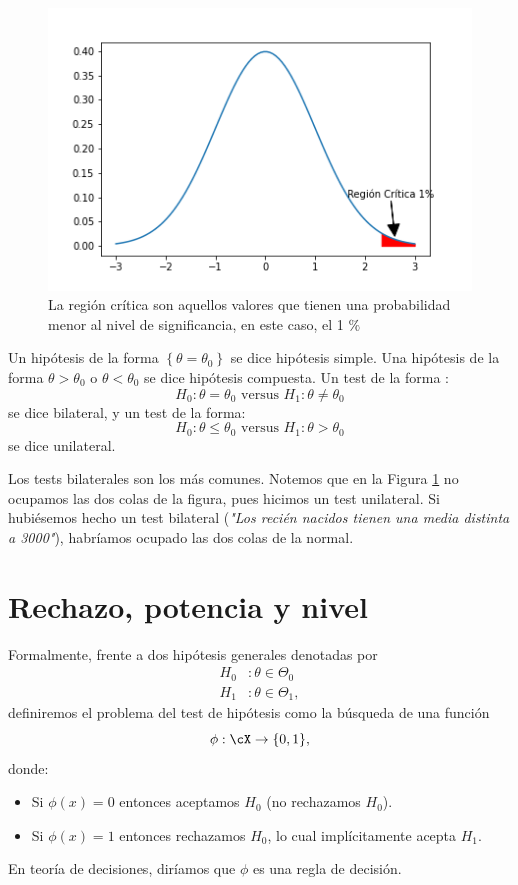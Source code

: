 \begin{figure}[ht]
    \centering
    \includegraphics[scale=0.7]{img/Region_critica.png}
    \caption{La región crítica son aquellos valores que tienen una probabilidad menor al nivel de significancia, en este caso, el 1 $\%$}
    \label{fig:region_critica}
\end{figure}
\begin{remark}
Un hipótesis de la forma $\left \{ \theta=\theta_0\right \}$ se dice hipótesis simple. Una hipótesis de la forma $\theta > \theta_0$ o $\theta < \theta_0$ se dice hipótesis compuesta. Un test de la forma :
 $$
 H_0: \theta=\theta_0 \text{ versus } H_1:\theta \not = \theta_0
 $$
se dice bilateral, y un test de la forma: 
$$
H_0: \theta \leq \theta_0 \text{ versus } H_1:\theta > \theta_0
$$
se dice unilateral. 

Los tests bilaterales son los más comunes.  Notemos que en la Figura \ref{fig:region_critica} no ocupamos las dos colas de la figura, pues hicimos un test unilateral. Si hubiésemos hecho un test bilateral (\emph{"Los recién nacidos tienen una media distinta a 3000"}), habríamos ocupado las dos colas de la normal. 
\end{remark}



\section{Rechazo, potencia y nivel} 
\label{sec:def_hipótesis}

Formalmente, frente a dos hipótesis generales denotadas por 
\begin{align}
	H_0&: \theta\in\Theta_0\\
	H_1&: \theta\in\Theta_1,
\end{align}
definiremos el problema del test de hipótesis como la búsqueda de una función
\begin{equation}
	\phi:\cX\rightarrow \{0,1\},
\end{equation}
donde:
\begin{itemize}
	\item Si $\phi(x)=0$ entonces aceptamos $H_0$ (no rechazamos $H_0$).
	\item Si $\phi(x)=1$ entonces rechazamos $H_0$, lo cual implícitamente acepta $H_1$. 
\end{itemize}
En teoría de decisiones, diríamos que $\phi$ es una regla de decisión. 

